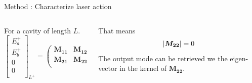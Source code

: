 \documentclass[aspectratio=169]{beamer}
\begin{document}
\begin{frame}{Method : Characterize laser action}
	\begin{columns}
		\begin{column}{0.5\textwidth}
			For a cavity of length $L$.
		\begin{equation*}
		\begin{bmatrix}
		E_a^+ \\
		E_b^+ \\
		0 \\
		0 \\
		\end{bmatrix}_{L^+} = \begin{pmatrix}
		\bm{M_{11}} & \bm{M_{12}}\\
		\bm{M_{21}} & \bm{M_{22}}\\
		\end{pmatrix}\begin{bmatrix}
		0 \\
		0 \\
		E_a^- \\
		E_b^- \\
		\end{bmatrix}_{0^-}
		\end{equation*}
		\end{column}
		\begin{column}{0.5\textwidth}
			That means
			\begin{equation*}
				\abs{\bm{M_{22}}} = 0
			\end{equation*}
			The output mode can be retrieved we the eigen-vector in the kernel of $\bm{M_{22}}$.
		\end{column}
	\end{columns}
\end{frame}
\end{document}
